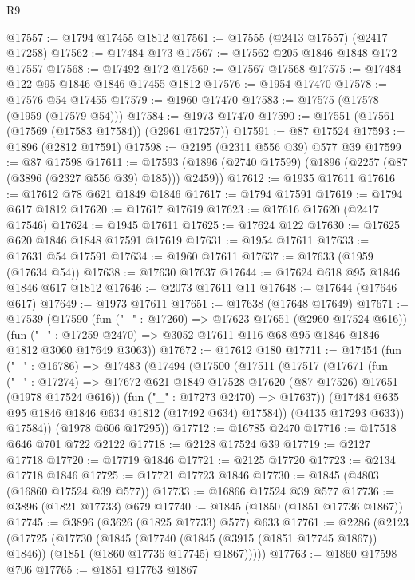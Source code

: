 \begin{lexlean}{R9}
\begin{coremodule}
@17557 := @1794 @17455 @1812
@17561 := @17555 (@2413 @17557) (@2417 @17258)
@17562 := @17484 @173
@17567 := @17562 @205 @1846 @1848 @172 @17557
@17568 := @17492 @172
@17569 := @17567 @17568
@17575 := @17484 @122 @95 @1846 @1846 @17455 @1812
@17576 := @1954 @17470
@17578 := @17576 @54 @17455
@17579 := @1960 @17470
@17583 := @17575 (@17578 (@1959 (@17579 @54)))
@17584 := @1973 @17470
@17590 := @17551 (@17561 (@17569 (@17583 @17584)) (@2961 @17257))
@17591 := @87 @17524
@17593 := @1896 (@2812 @17591)
@17598 := @2195 (@2311 @556 @39) @577 @39
@17599 := @87 @17598
@17611 := @17593 (@1896 (@2740 @17599) (@1896 (@2257 (@87 (@3896 (@2327 @556 @39) @185))) @2459))
@17612 := @1935 @17611
@17616 := @17612 @78 @621 @1849 @1846
@17617 := @1794 @17591
@17619 := @1794 @617 @1812
@17620 := @17617 @17619
@17623 := @17616 @17620 (@2417 @17546)
@17624 := @1945 @17611
@17625 := @17624 @122
@17630 := @17625 @620 @1846 @1848 @17591 @17619
@17631 := @1954 @17611
@17633 := @17631 @54 @17591
@17634 := @1960 @17611
@17637 := @17633 (@1959 (@17634 @54))
@17638 := @17630 @17637
@17644 := @17624 @618 @95 @1846 @1846 @617 @1812
@17646 := @2073 @17611 @11
@17648 := @17644 (@17646 @617)
@17649 := @1973 @17611
@17651 := @17638 (@17648 @17649)
@17671 := @17539
    (@17590
      (fun ("_" : @17260) => @17623 @17651 (@2960 @17524 @616))
      (fun ("_" : @17259 @2470) => @3052 @17611 @116 @68 @95 @1846 @1846 @1812 @3060 @17649 @3063))
@17672 := @17612 @180
@17711 := @17454
    (fun ("_" : @16786) =>
    @17483
      (@17494
        (@17500
          (@17511
            (@17517
              (@17671
                (fun ("_" : @17274) =>
                @17672 @621 @1849 @17528 @17620 (@87 @17526) @17651 (@1978 @17524 @616))
                (fun ("_" : @17273 @2470) => @17637))
              (@17484 @635 @95 @1846 @1846 @634 @1812 (@17492 @634) @17584))
            (@4135 @17293 @633))
          @17584))
      (@1978 @606 @17295))
@17712 := @16785 @2470
@17716 := @17518 @646 @701 @722 @2122
@17718 := @2128 @17524 @39
@17719 := @2127 @17718
@17720 := @17719 @1846
@17721 := @2125 @17720
@17723 := @2134 @17718 @1846
@17725 := @17721 @17723 @1846
@17730 := @1845 (@4803 (@16860 @17524 @39 @577))
@17733 := @16866 @17524 @39 @577
@17736 := @3896 (@1821 @17733) @679
@17740 := @1845 (@1850 (@1851 @17736 @1867))
@17745 := @3896 (@3626 (@1825 @17733) @577) @633
@17761 := @2286
    (@2123
      (@17725
        (@17730
          (@1845
            (@17740 (@1845 (@3915 (@1851 @17745 @1867)) @1846))
            (@1851 (@1860 @17736 @17745) @1867)))))
@17763 := @1860 @17598 @706
@17765 := @1851 @17763 @1867

\end{coremodule}
\end{lexlean}
